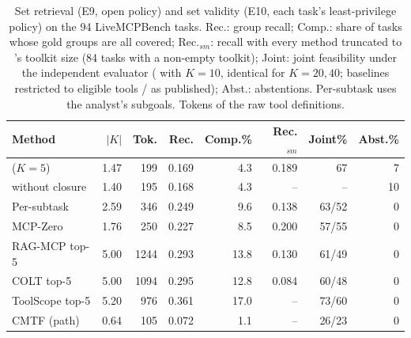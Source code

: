 \begin{table}[t]
\caption{Set retrieval (E9, open policy) and set validity (E10, each task's least-privilege policy) on the 94
LiveMCPBench tasks. Rec.: group recall; Comp.: share of tasks whose gold groups are all covered; Rec.$_{sm}$:
recall with every method truncated to \pamcp{}'s toolkit size (84 tasks with a non-empty toolkit); Joint: joint
feasibility under the independent evaluator (\pamcp{} with $K{=}10$, identical for $K{=}20, 40$; baselines
restricted to eligible tools / as published); Abst.: abstentions. Per-subtask uses the analyst's subgoals. Tokens
of the raw tool definitions.}
\label{tab:ev-sets}
\centering\footnotesize\setlength{\tabcolsep}{1.5pt}
\begin{tabular}{@{}lrrrrrrr@{}}
\toprule
Method & $|K|$ & Tok. & Rec. & Comp.\% & Rec.$_{sm}$ & Joint\% & Abst.\%\\
\midrule
\pamcp{} ($K{=}5$) & 1.47 & 199 & 0.169 & 4.3 & 0.189 & 67 & 7\\
\quad without closure & 1.40 & 195 & 0.168 & 4.3 & -- & -- & 10\\
Per-subtask & 2.59 & 346 & 0.249 & 9.6 & 0.138 & 63/52 & 0\\
MCP-Zero & 1.76 & 250 & 0.227 & 8.5 & 0.200 & 57/55 & 0\\
RAG-MCP top-5 & 5.00 & 1244 & 0.293 & 13.8 & 0.130 & 61/49 & 0\\
COLT top-5 & 5.00 & 1094 & 0.295 & 12.8 & 0.084 & 60/48 & 0\\
ToolScope top-5 & 5.20 & 976 & 0.361 & 17.0 & -- & 73/60 & 0\\
CMTF (path) & 0.64 & 105 & 0.072 & 1.1 & -- & 26/23 & 0\\
\bottomrule
\end{tabular}
\end{table}
